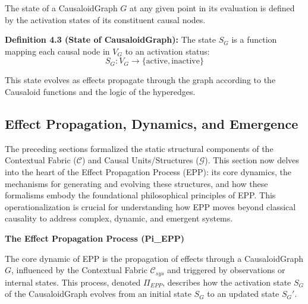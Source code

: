         
\begin{definition}
\label{def:causaloid_graph_edges}        
        The state of a CausaloidGraph \( G \) at any given point in its evaluation is defined by the activation states of its constituent causal nodes. 
        
        \textbf{Definition 4.3 (State of CausaloidGraph):} The state \( S_G \) is a function mapping each causal node in \(V_G\) to an activation status:
        \[ S_G: V_G \to \{\text{active}, \text{inactive}\} \]
\end{definition}

This state evolves as effects propagate through the graph according to the Causaloid functions and the logic of the hyperedges.

\newpage


\subsection{Effect Propagation, Dynamics, and Emergence}
\label{sec:formalization_epp}

The preceding sections formalized the static structural components of the Contextual Fabric (\(\mathcal{C}\)) and Causal Units/Structures (\(\mathcal{G}\)). This section now delves into the heart of the Effect Propagation Process (EPP): its core dynamics, the mechanisms for generating and evolving these structures, and how these formalisms embody the foundational philosophical principles of EPP. This operationalization is crucial for understanding how EPP moves beyond classical causality to address complex, dynamic, and emergent systems.

\textbf{The Effect Propagation Process (Pi\_EPP)}


The core dynamic of EPP is the propagation of effects through a CausaloidGraph \(G\), influenced by the Contextual Fabric \(\mathcal{C}_{sys}\) and triggered by observations or internal states. This process, denoted \(\Pi_{EPP}\), describes how the activation state \(S_G\) of the CausaloidGraph evolves from an initial state \(S_G\) to an updated state \(S_G'\).


